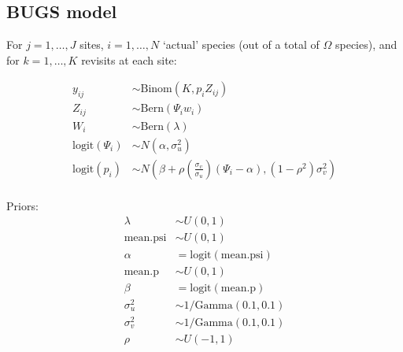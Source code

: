 \documentclass[fleqn]{article}
\begin{document}
\subsection{BUGS model}
%
%
For $j = 1, \ldots, J$ sites,  $i = 1, \ldots, N$ `actual' species (out of a total of $\Omega$ species), and for $k = 1, \ldots, K$ revisits at each site:

%
%
\begin{align*}
  y_{ij} & \sim \mbox{Binom} (K, p_iZ_{ij}) \\
  Z_{ij} & \sim \mbox{Bern} (\Psi_iw_i) \\
  W_i & \sim \mbox{Bern} (\lambda) \\
%
  \mbox{logit} (\Psi_i) & \sim N\left(\alpha, \sigma_u^2 \right) \\
  \mbox{logit} (p_i) & \sim N \left( \beta + \rho \left( \frac{\sigma_v}{\sigma_u} \right) \left(\Psi_i - \alpha \right) ,  \left( 1 - \rho^2 \right) \sigma_v^2 \right)   \\
 \end{align*}
 
 Priors:
 \begin{align*}
  \lambda & \sim U(0, 1)  \\
  \mbox{mean.psi} & \sim U(0, 1)  \\
  \alpha & = \mbox{logit} (\mbox{mean.psi} )  \\
  \mbox{mean.p} & \sim U(0, 1)  \\
  \beta &= \mbox{logit} (\mbox{mean.p})  \\
  \sigma_u^2 & \sim 1 / \mbox{Gamma}(0.1, 0.1)  \\
  \sigma_v^2 & \sim  1/ \mbox{Gamma}(0.1, 0.1)  \\
  \rho & \sim U(-1, 1)  \\
%
\end{align*}
\end{document}
